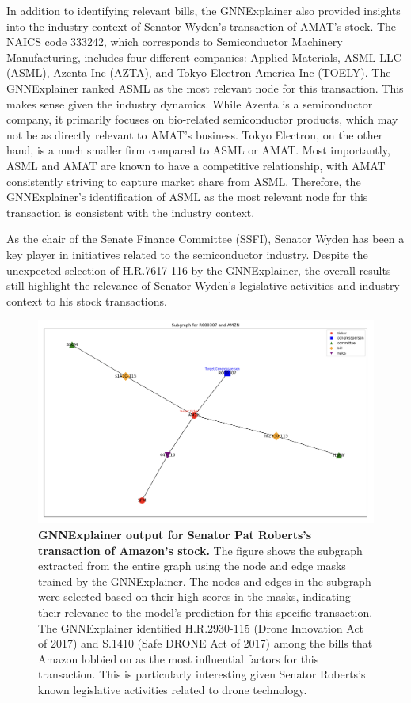 \documentclass[15pt,letterpaper]{article}
\begin{document}
In addition to identifying relevant bills, the GNNExplainer also provided insights into the industry context of Senator Wyden's transaction of AMAT's stock. The NAICS code 333242, which corresponds to Semiconductor Machinery Manufacturing, includes four different companies: Applied Materials, ASML LLC (ASML), Azenta Inc (AZTA), and Tokyo Electron America Inc (TOELY). The GNNExplainer ranked ASML as the most relevant node for this transaction. This makes sense given the industry dynamics. While Azenta is a semiconductor company, it primarily focuses on bio-related semiconductor products, which may not be as directly relevant to AMAT's business. Tokyo Electron, on the other hand, is a much smaller firm compared to ASML or AMAT. Most importantly, ASML and AMAT are known to have a competitive relationship, with AMAT consistently striving to capture market share from ASML.
Therefore, the GNNExplainer's identification of ASML as the most relevant node for this transaction is consistent with the industry context.

As the chair of the Senate Finance Committee (SSFI), Senator Wyden has been a key player in initiatives related to the semiconductor industry. Despite the unexpected selection of H.R.7617-116 by the GNNExplainer, the overall results still highlight the relevance of Senator Wyden's legislative activities and industry context to his stock transactions.

\begin{figure}[h!]
  \centering
  \includegraphics[width=1.1\textwidth, height=0.4\textheight]{imgs/gnnex-rob-pat.png}
  \caption{\textbf{GNNExplainer output for Senator Pat Roberts's transaction of Amazon's stock.} The figure shows the subgraph extracted from the entire graph using the node and edge masks trained by the GNNExplainer. The nodes and edges in the subgraph were selected based on their high scores in the masks, indicating their relevance to the model's prediction for this specific transaction. The GNNExplainer identified H.R.2930-115 (Drone Innovation Act of 2017) and S.1410 (Safe DRONE Act of 2017) among the bills that Amazon lobbied on as the most influential factors for this transaction. This is particularly interesting given Senator Roberts's known legislative activities related to drone technology.}
  \label{fig:pat-gnnex}
\end{figure}
\end{document}
